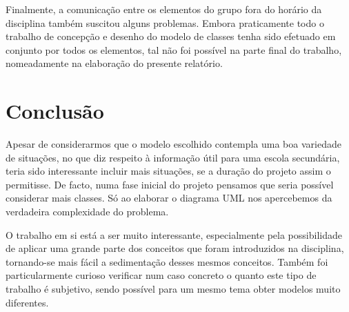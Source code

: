 \documentclass[12pt,a4paper,reqno]{report}
\numberwithin{figure}{section}
\numberwithin{equation}{section}
\begin{document}
Finalmente, a comunicação entre os elementos do grupo fora do horário da disciplina também suscitou alguns problemas. Embora praticamente todo o trabalho de concepção e desenho do modelo de classes tenha sido efetuado em conjunto por todos os elementos, tal não foi possível na parte final do trabalho, nomeadamente na elaboração do presente relatório.

\chapter{Conclusão}

Apesar de considerarmos que o modelo escolhido contempla uma boa variedade de situações, no que diz respeito à informação útil para uma escola secundária, teria sido interessante incluir mais situações, se a duração do projeto assim o permitisse. De facto, numa fase inicial do projeto pensamos que seria possível considerar mais classes. Só ao elaborar o diagrama UML nos apercebemos da verdadeira complexidade do problema.

O trabalho em si está a ser muito interessante, especialmente pela possibilidade de aplicar uma grande parte dos conceitos que foram introduzidos na disciplina, tornando-se mais fácil a sedimentação desses mesmos conceitos. Também foi particularmente curioso verificar num caso concreto o quanto este tipo de trabalho é subjetivo, sendo possível para um mesmo tema obter modelos muito diferentes.
\end{document}
